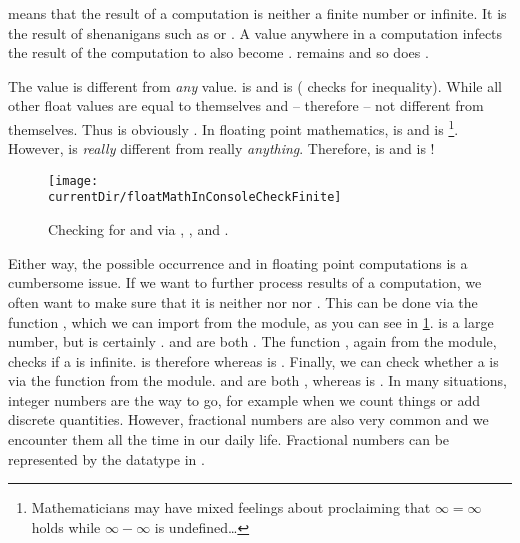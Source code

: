  means that the result of a computation is neither a finite number or infinite.
It is the result of shenanigans such as  or .
A  value anywhere in a computation infects the result of the computation to also become .
 remains  and so does .

The value  is different from \emph{any} value.
 is  and  is  (\pythonil{!=} checks for inequality).
While all other float values are equal to themselves and -- therefore -- not different from themselves.
Thus  is obviously .
In floating point mathematics,  is  and  is \footnote{%
Mathematicians may have mixed feelings about proclaiming that $\infty=\infty$ holds while $\infty-\infty$ is undefined\dots}.
However,  is \emph{really} different from really \emph{anything}.
Therefore, \pythonIdx{==} is  and  is !

\begin{figure}%
\centering%
\texttt{[image: \\currentDir/floatMathInConsoleCheckFinite]}%
\caption{Checking for  and  via , , and .}%
\label{fig:floatMathInConsoleCheckFinite}%
\end{figure}%

Either way, the possible occurrence  and  in floating point computations is a cumbersome issue.
If we want to further process results of a computation, we often want to make sure that it is neither  nor  nor .
This can be done via the function , which we can import from the  module, as you can see in \cref{fig:floatMathInConsoleCheckFinite}.
 is a large number, but  is certainly .
 and  are both .
The function , again from the  module, checks if a  is infinite.
 is therefore  whereas  is .
Finally, we can check whether a  is  via the  function from the  module.
 and  are both , whereas  is .%
%
\endhsection%
%
%
%
In many situations, integer numbers are the way to go, for example when we count things or add discrete quantities.
However, fractional numbers are also very common and we encounter them all the time in our daily life.
Fractional numbers can be represented by the  datatype in \python.

